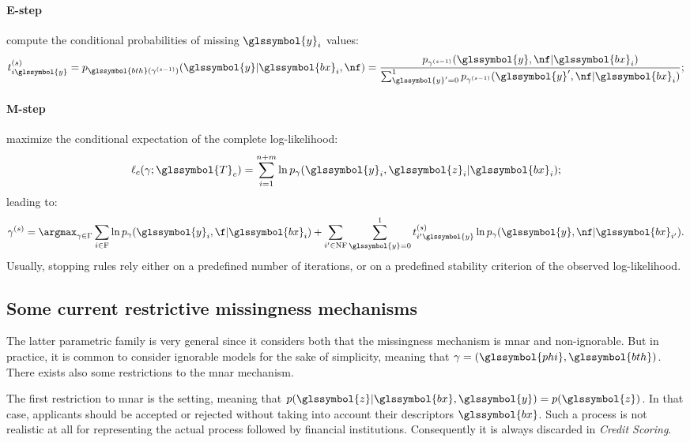 \paragraph{E-step} compute the conditional probabilities of missing $\glssymbol{y}_i$ values:
\begin{equation}
t_{i\glssymbol{y}}^{(s)} = p_{\glssymbol{bth}(\gamma^{(s-1)})}(\glssymbol{y}|\glssymbol{bx}_i,\nf) = \frac{p_{\gamma^{(s-1)}}(\glssymbol{y}, \nf|\glssymbol{bx}_i)}{\sum_{\glssymbol{y}' = 0}^{1} p_{\gamma^{(s-1)}}(\glssymbol{y}', \nf|\glssymbol{bx}_i)};
\end{equation}
\paragraph{M-step} maximize the conditional expectation of the complete log-likelihood:
\begin{equation}\label{eq:like.c}
\ell_c(\gamma;\glssymbol{T}_c) = \sum_{i=1}^{n+m}\ln p_{\gamma}(\glssymbol{y}_i,\glssymbol{z}_i | \glssymbol{bx}_i);
\end{equation}
leading to:
\begin{equation}
\gamma^{(s)} = \argmax_{\gamma \in \Gamma} \sum_{i\in \text{F}} \ln p_{\gamma}(\glssymbol{y}_i, \f|\glssymbol{bx}_i) +  \sum_{i'\in \text{NF}}\sum_{\glssymbol{y} = 0}^{1}t_{i'\glssymbol{y}}^{(s)} \ln p_{\gamma}(\glssymbol{y}, \nf | \glssymbol{bx}_{i'}).
\end{equation}
Usually, stopping rules rely either on a predefined number of iterations, or on a predefined stability criterion of the observed log-likelihood.

\subsection{Some current restrictive missingness mechanisms}
\label{sec:mechanisms}

The latter parametric family is very general since it considers both that the missingness mechanism is \gls{mnar} and non-ignorable. But in practice, it is common to consider ignorable models for the sake of simplicity, meaning that $\gamma= (\glssymbol{phi},\glssymbol{bth})$. There exists also some restrictions to the \gls{mnar} mechanism. 

The first restriction to \gls{mnar} is the  setting, meaning that $p(\glssymbol{z}| \glssymbol{bx},\glssymbol{y}) = p(\glssymbol{z})$. In that case, applicants should be accepted or rejected without taking into account their descriptors $\glssymbol{bx}$. Such a process is not realistic at all for representing the actual process followed by financial institutions. Consequently it is always discarded in \textit{Credit Scoring}.

